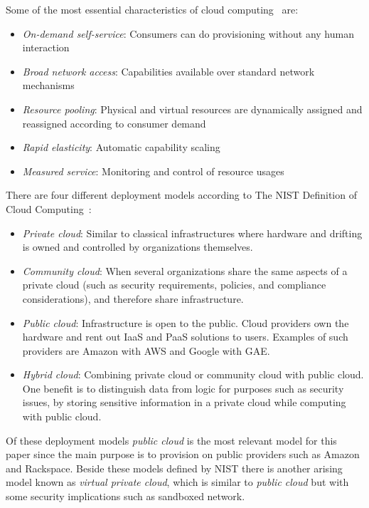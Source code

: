 Some of the most essential characteristics of cloud computing~\cite{nist:mell11} are:
\begin{itemize}
  \item \emph{On-demand self-service}: Consumers can do provisioning without any human interaction
  \item \emph{Broad network access}: Capabilities available over standard network mechanisms
  \item \emph{Resource pooling}: Physical and virtual resources are dynamically assigned
    and reassigned according to consumer demand
  \item \emph{Rapid elasticity}: Automatic capability scaling
  \item \emph{Measured service}: Monitoring and control of resource usages
\end{itemize}

There are four different deployment models according to The 
NIST Definition of Cloud Computing~\cite{nist:mell11}:
\begin{itemize}
  \item \emph{Private cloud}: Similar to classical infrastructures where hardware and
    drifting is owned and controlled by organizations themselves.
  \item \emph{Community cloud}: When several organizations share the same aspects of
    a private cloud (such as security requirements, policies, and compliance considerations),
    and therefore share infrastructure.
  \item \emph{Public cloud}: Infrastructure is open to the public.
    Cloud providers own the hardware and rent out IaaS and PaaS solutions to users.
    Examples of such providers are Amazon with AWS and Google with GAE.
  \item \emph{Hybrid cloud}: Combining private cloud or community cloud with public cloud.
    One benefit is to distinguish data from logic for purposes such as security issues,
    by storing sensitive information in a private cloud while computing with public cloud.
\end{itemize}

Of these deployment models \emph{public cloud} is the most relevant model for this paper
since the main purpose is to provision on public providers such as Amazon and Rackspace.
Beside these models defined by NIST there is another arising model known as 
\emph{virtual private cloud}, which is similar to \emph{public cloud} 
but with some security implications such as sandboxed network.

